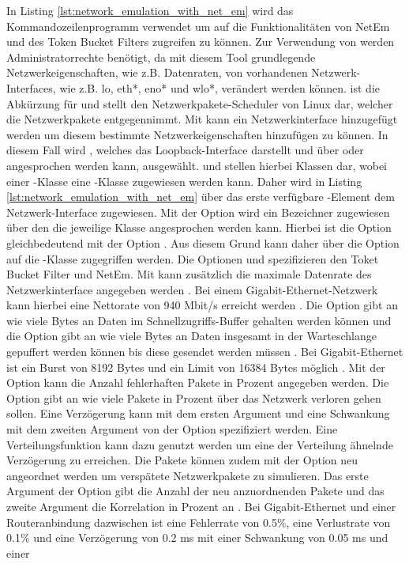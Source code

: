 In Listing \ref{lst:network_emulation_with_net_em} wird das Kommandozeilenprogramm  verwendet um auf die Funktionalitäten von NetEm und des Token Bucket Filters zugreifen zu können. Zur Verwendung von  werden Administratorrechte benötigt, da mit diesem Tool grundlegende Netzwerkeigenschaften, wie z.B. Datenraten, von vorhandenen Netzwerk-Interfaces, wie z.B. lo, eth*, eno* und wlo*, verändert werden können.  ist die Abkürzung für  und stellt den Netzwerkpakete-Scheduler von Linux dar, welcher die Netzwerkpakete entgegennimmt. Mit  kann ein Netzwerkinterface hinzugefügt werden um diesem bestimmte Netzwerkeigenschaften hinzufügen zu können. In diesem Fall wird , welches das Loopback-Interface darstellt und über  oder  angesprochen werden kann, ausgewählt.  und  stellen hierbei Klassen dar, wobei einer -Klasse eine -Klasse zugewiesen werden kann. Daher wird in Listing \ref{lst:network_emulation_with_net_em} über  das erste verfügbare -Element dem Netzwerk-Interface zugewiesen. Mit der Option  wird ein Bezeichner zugewiesen über den die jeweilige Klasse angesprochen werden kann. Hierbei ist die Option  gleichbedeutend mit der Option . Aus diesem Grund kann daher über die Option  auf die -Klasse zugegriffen werden. Die Optionen  und  spezifizieren den Toket Bucket Filter und NetEm. Mit  kann zusätzlich die maximale Datenrate des Netzwerkinterface angegeben werden \cite{tc_net_em_nodate}. Bei einem Gigabit-Ethernet-Netzwerk kann hierbei eine Nettorate von 940 Mbit/s erreicht werden \cite{datendurchsatz_2020}. Die Option  gibt an wie viele Bytes an Daten im Schnellzugriffs-Buffer gehalten werden können und die Option  gibt an wie viele Bytes an Daten insgesamt in der Warteschlange gepuffert werden können bis diese gesendet werden müssen \cite{tc_net_em_nodate}. Bei Gigabit-Ethernet ist ein Burst von 8192 Bytes und ein Limit von 16384 Bytes möglich \cite{dembowski_lokale_2007}. Mit der Option  kann die Anzahl fehlerhaften Pakete in Prozent angegeben werden. Die Option  gibt an wie viele Pakete in Prozent über das Netzwerk verloren gehen sollen. Eine Verzögerung kann mit dem ersten Argument und eine Schwankung mit dem zweiten Argument von der Option  spezifiziert werden. Eine Verteilungsfunktion kann dazu genutzt werden um eine der Verteilung ähnelnde Verzögerung zu erreichen. Die Pakete können zudem mit der Option  neu angeordnet werden um verspätete Netzwerkpakete zu simulieren. Das erste Argument der Option  gibt die Anzahl der neu anzuordnenden Pakete und das zweite Argument die Korrelation in Prozent an \cite{tbf_token_bucket_filter_nodate}. Bei Gigabit-Ethernet und einer Routeranbindung dazwischen ist eine Fehlerrate von \num{0,5}\%, eine Verlustrate von \num{0,1}\% und eine Verzögerung von \num{0,2} ms mit einer Schwankung von \num{0,05} ms und einer 